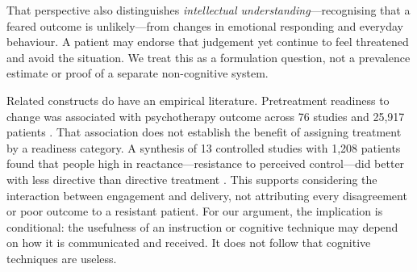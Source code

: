 That perspective also distinguishes \emph{intellectual understanding}---recognising that a feared outcome is unlikely---from changes in emotional responding and everyday behaviour.
A patient may endorse that judgement yet continue to feel threatened and avoid the situation.
We treat this as a formulation question, not a prevalence estimate or proof of a separate non-cognitive system.

Related constructs do have an empirical literature.
Pretreatment readiness to change was associated with psychotherapy outcome across 76 studies and 25,917 patients \citep{krebs2018readiness}.
That association does not establish the benefit of assigning treatment by a readiness category.
A synthesis of 13 controlled studies with 1,208 patients found that people high in reactance---resistance to perceived control---did better with less directive than directive treatment \citep{beutler2018reactance}.
This supports considering the interaction between engagement and delivery, not attributing every disagreement or poor outcome to a resistant patient.
For our argument, the implication is conditional: the usefulness of an instruction or cognitive technique may depend on how it is communicated and received.
It does not follow that cognitive techniques are useless.

